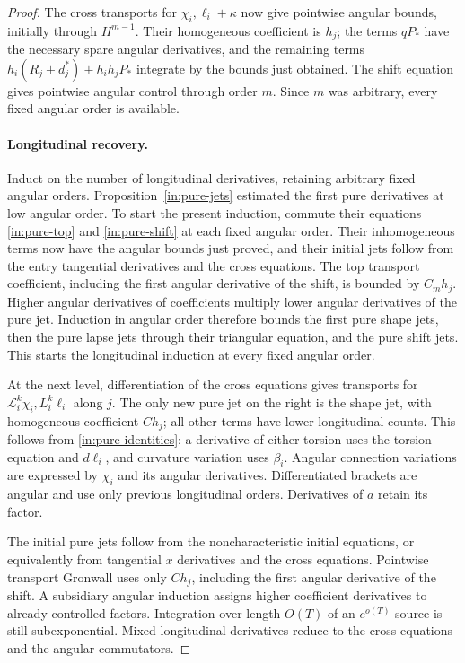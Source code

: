 \begin{proof}
The cross transports for $\chi_i,\ell_i+\kappa$ now give
pointwise angular bounds, initially through $H^{m-1}$.
Their homogeneous coefficient is $h_j$; the terms $qP_*$ have the
necessary spare angular derivatives, and the remaining terms
$h_i(R_j+d_j^*)+h_i h_jP_*$ integrate by the bounds just obtained.
The shift equation gives pointwise angular control through order $m$.
Since $m$ was arbitrary, every fixed angular order is available.

\paragraph{Longitudinal recovery.}
Induct on the number of longitudinal derivatives, retaining arbitrary
fixed angular orders. Proposition~\ref{in:pure-jets} estimated the first
pure derivatives at low angular order. To start the present induction,
commute their equations \eqref{in:pure-top} and \eqref{in:pure-shift}
at each fixed angular order. Their inhomogeneous terms now have the
angular bounds just proved, and their initial jets follow from the
entry tangential derivatives and the cross equations. The top transport
coefficient, including the first angular derivative of the shift, is
bounded by $C_mh_j$. Higher angular derivatives of coefficients multiply
lower angular derivatives of the pure jet. Induction in angular order therefore bounds the first
pure shape jets, then the pure lapse jets through their triangular
equation, and the pure shift jets. This starts the longitudinal
induction at every fixed angular order.

At the next level, differentiation of the cross equations gives
transports for $\mathscr L_i^k\chi_i,L_i^k\ell_i$ along $j$.
The only new pure jet on the right is the shape jet, with homogeneous
coefficient $Ch_j$; all other terms have lower longitudinal counts.
This follows from \eqref{in:pure-identities}: a derivative of either
torsion uses the torsion equation and $d\ell_i$, and curvature
variation uses $\beta_i$. Angular connection variations are expressed
by $\chi_i$ and its angular derivatives. Differentiated brackets
are angular and use only previous longitudinal orders. Derivatives of
$a$ retain its factor.

The initial pure jets follow from the noncharacteristic initial
equations, or equivalently from tangential $x$ derivatives and the
cross equations. Pointwise transport Gronwall uses only $Ch_j$,
including the first angular derivative of the shift. A subsidiary
angular induction assigns higher coefficient derivatives to already
controlled factors. Integration over length $O(T)$ of an $e^{o(T)}$
source is still subexponential. Mixed longitudinal derivatives reduce
to the cross equations and the angular commutators.


\end{proof}
